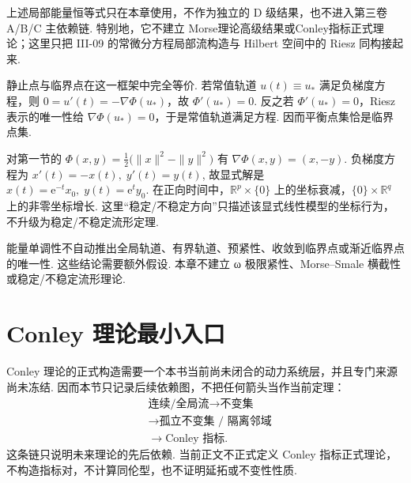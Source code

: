 上述局部能量恒等式只在本章使用，不作为独立的 D 级结果，也不进入第三卷 A/B/C 主依赖链. 特别地，它不建立 Morse理论高级结果或Conley指标正式理论；这里只把 III-09 的常微分方程局部流构造与 Hilbert 空间中的 Riesz 同构接起来.

静止点与临界点在这一框架中完全等价. 若常值轨道 \(\displaystyle u(t)\equiv u_*\) 满足负梯度方程，则 \(\displaystyle0=u'(t)=-\nabla\Phi(u_*)\)，故 \(\displaystyle\Phi'(u_*)=0\). 反之若 \(\displaystyle\Phi'(u_*)=0\)，Riesz 表示的唯一性给 \(\displaystyle\nabla\Phi(u_*)=0\)，于是常值轨道满足方程. 因而平衡点集恰是临界点集.

\begin{FAExample}[有限维二次梯度流]\label{iii11:quadratic-gradient-flow}
对第一节的
\(\displaystyle \Phi(x,y) = \frac{1}{2}\bigl(\|x\|^2-\|y\|^2\bigr)\)
有 \(\displaystyle\nabla\Phi(x,y)=(x,-y)\). 负梯度方程为
\(\displaystyle x'(t)=-x(t), \; y'(t)=y(t)\),
故显式解是
\(\displaystyle x(t)=\mathrm{e}^{-t}x_0, \; y(t)=\mathrm{e}^t y_0\).
在正向时间中，\(\displaystyle\mathbb R^p\times\{0\}\) 上的坐标衰减，\(\displaystyle\{0\}\times\mathbb R^q\) 上的非零坐标增长. 这里“稳定/不稳定方向”只描述该显式线性模型的坐标行为，不升级为稳定/不稳定流形定理.
\end{FAExample}

\begin{FARemark}[梯度流结论边界]
能量单调性不自动推出全局轨道、有界轨道、预紧性、收敛到临界点或渐近临界点的唯一性. 这些结论需要额外假设. 本章不建立 ω 极限紧性、Morse--Smale 横截性或稳定/不稳定流形理论.
\end{FARemark}

\section{Conley 理论最小入口}\label{sec:iii11-conley-minimum-entry}

Conley 理论的正式构造需要一个本书当前尚未闭合的动力系统层，并且专门来源尚未冻结. 因而本节只记录后续依赖图，不把任何箭头当作当前定理：
\[
\begin{aligned}
&\text{连续/全局流}\longrightarrow\text{不变集}\\
&\longrightarrow\text{孤立不变集 / 隔离邻域}\\
&\longrightarrow\text{Conley 指标}.
\end{aligned}
\]
这条链只说明未来理论的先后依赖. 当前正文不正式定义 Conley 指标正式理论，不构造指标对，不计算同伦型，也不证明延拓或不变性性质.

